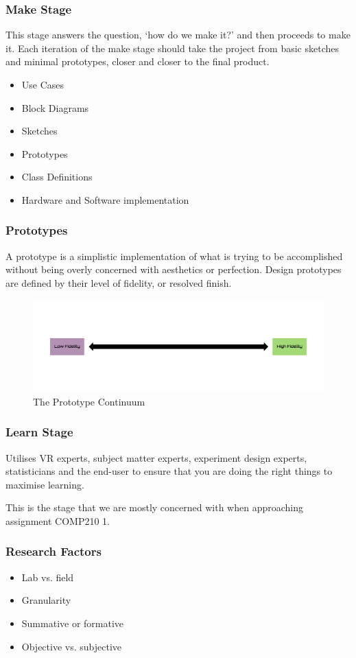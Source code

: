 \begin{frame}
	\frametitle{Make Stage}
	This stage answers the question, `how do we make it?' and then proceeds to make it. Each iteration of the make stage should take the project from basic sketches and minimal prototypes, closer and closer to the final product. 
	
\pause
	\begin{itemize}
		\item Use Cases
		\item Block Diagrams 
		\item Sketches				
		\item Prototypes
		\item Class Definitions
		\item Hardware and Software implementation   		
	\end{itemize}
\end{frame}

\begin{frame}
	\frametitle{Prototypes}
	A prototype is a simplistic implementation of what is trying to be accomplished without being overly concerned with aesthetics or perfection. Design prototypes are defined by their level of fidelity, or resolved finish. 
	\begin{figure}
		\includegraphics[scale=0.23]{assets/prototype.png}
		\caption{The Prototype Continuum}
	\end{figure}
\end{frame}


\begin{frame}
	\frametitle{Learn Stage}
	Utilises VR experts, subject matter experts, experiment design experts, statisticians and the end-user to ensure that you are doing the right things to maximise learning. 
	
	\vspace{.2in}
	This is the stage that we are mostly concerned with when approaching assignment COMP210 1.
\end{frame}

\begin{frame}
	\frametitle{Research Factors}
	\begin{itemize}
		\item Lab vs. field
		\item Granularity
		\item Summative or formative
		\item Objective vs. subjective
	\end{itemize}
\end{frame}

